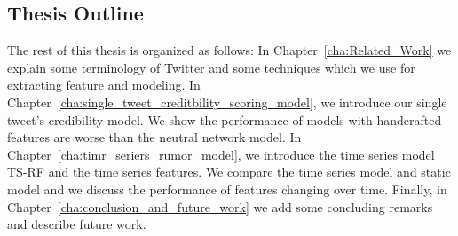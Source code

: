  
\subsection{Thesis Outline}

The rest of this thesis is organized as follows: In Chapter~\ref{cha:Related_Work} we explain some terminology of Twitter and some techniques which we use for extracting feature and modeling. In Chapter~\ref{cha:single_tweet_creditbility_scoring_model}, we introduce our single tweet's credibility model. We show the performance of models with handcrafted features are worse than the neutral network model. In Chapter~\ref{cha:timr_seriers_rumor_model}, we introduce the time series model TS-RF and the time series features. We compare the time series model and static model and we discuss the performance of features changing over time. Finally, in Chapter~\ref{cha:conclusion_and_future_work} we add some concluding remarks and describe future work.

